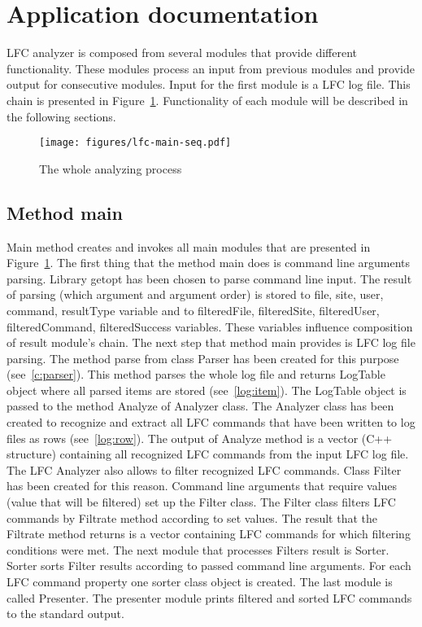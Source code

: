 \documentclass[a4paper, 11pt]{article} %
\begin{document}

\section*{Application documentation}

LFC analyzer is composed from several modules that provide different functionality. These modules process an input from previous modules and provide output for consecutive modules. Input for the first module is a LFC log file. This chain is presented in Figure~\ref{fig:main-seq}. Functionality of each module will be described in the following sections. 

\begin{figure}[H]
	\centering
	\texttt{[image: figures/lfc-main-seq.pdf]}
	\caption{The whole analyzing process}
	\label{fig:main-seq}
\end{figure}


\subsection{Method main}

Main method creates and invokes all main modules that are presented in Figure~\ref{fig:main-seq}. The first thing that the method main does is command line arguments parsing. Library getopt has been chosen to parse command line input. The result of parsing (which argument and argument order) is stored to file, site, user, command, resultType variable and to filteredFile, filteredSite, filteredUser, filteredCommand, filteredSuccess variables. These variables influence composition of result module's chain. The next step that method main provides is LFC log file parsing. The method parse from class Parser has been created for this purpose (see~\ref{c:parser}). This method parses the whole log file and returns LogTable object where all parsed items are stored (see~\ref{log:item}). The LogTable object is passed to the method Analyze of Analyzer class. The Analyzer class has been created to recognize and extract all LFC commands that have been written to log files as rows (see~\ref{log:row}). The output of Analyze method is a vector (C++ structure) containing all recognized LFC commands from the input LFC log file. The LFC Analyzer also allows to filter recognized LFC commands. Class Filter has been created for this reason. Command line arguments that require values (value that will be filtered) set up the Filter class. The Filter class filters LFC commands by Filtrate method according to set values. The result that the Filtrate method returns is a vector containing LFC commands for which filtering conditions were met. The next module that processes Filters result is Sorter. Sorter sorts Filter results according to passed command line arguments. For each LFC command property one sorter class object is created. The last module is called Presenter. The presenter module prints filtered and sorted LFC commands to the standard output.
\end{document}

